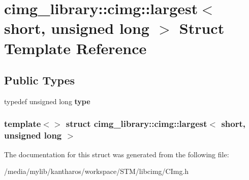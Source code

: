\hypertarget{structcimg__library_1_1cimg_1_1largest_3_01short_00_01unsigned_01long_01_4}{
\section{cimg\_\-library::cimg::largest$<$ short, unsigned long $>$ Struct Template Reference}
\label{structcimg__library_1_1cimg_1_1largest_3_01short_00_01unsigned_01long_01_4}
}
\subsection*{Public Types}
\begin{DoxyCompactItemize}
\item 
\hypertarget{structcimg__library_1_1cimg_1_1largest_3_01short_00_01unsigned_01long_01_4_ade46724bc6240ec876d99b2a91ec7514}{
typedef unsigned long {\bfseries type}}
\label{structcimg__library_1_1cimg_1_1largest_3_01short_00_01unsigned_01long_01_4_ade46724bc6240ec876d99b2a91ec7514}

\end{DoxyCompactItemize}
\subsubsection*{template$<$$>$ struct cimg\_\-library::cimg::largest$<$ short, unsigned long $>$}



The documentation for this struct was generated from the following file:\begin{DoxyCompactItemize}
\item 
/media/mylib/kantharos/workspace/STM/libcimg/CImg.h\end{DoxyCompactItemize}
